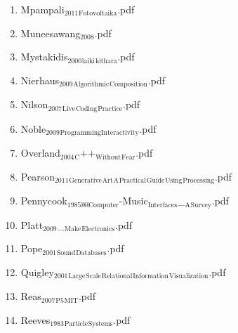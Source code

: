\documentclass[11pt]{article}
\begin{document}
\begin{enumerate}
\begin{enumerate}
\begin{enumerate}
\begin{enumerate}
\begin{enumerate}
\item Mpampali$_{\text{2011}}$$_{\text{Fotovoltaika}}$.pdf
\label{sec-1-1-1-1-7-1-1-75}

\item Muneesawang$_{\text{2008}}$.pdf
\label{sec-1-1-1-1-7-1-1-76}

\item Mystakidis$_{\text{2000}}$$_{\text{laiki}}$$_{\text{kithara}}$.pdf
\label{sec-1-1-1-1-7-1-1-77}

\item Nierhaus$_{\text{2009}}$$_{\text{Algorithmic}}$$_{\text{Composition}}$.pdf
\label{sec-1-1-1-1-7-1-1-78}

\item Nilson$_{\text{2007}}$$_{\text{Live}}$$_{\text{Coding}}$$_{\text{Practice}}$.pdf
\label{sec-1-1-1-1-7-1-1-79}

\item Noble$_{\text{2009}}$$_{\text{ProgrammingInteractivity}}$.pdf
\label{sec-1-1-1-1-7-1-1-80}

\item Overland$_{\text{2004}}$$_{\text{C}}$++$_{\text{Without}}$$_{\text{Fear}}$.pdf
\label{sec-1-1-1-1-7-1-1-81}

\item Pearson$_{\text{2011}}$$_{\text{Generative}}$$_{\text{Art}}$$_{\text{A}}$$_{\text{Practical}}$$_{\text{Guide}}$$_{\text{Using}}$$_{\text{Processing}}$.pdf
\label{sec-1-1-1-1-7-1-1-82}

\item Pennycook$_{\text{1985}}$$_{\text{￼Computer}}$-Music$_{\text{Interfaces}}$\_$_{\text{A}}$$_{\text{Survey}}$.pdf
\label{sec-1-1-1-1-7-1-1-83}

\item Platt$_{\text{2009}}$\_$_{\text{Make}}$$_{\text{Electronics}}$.pdf
\label{sec-1-1-1-1-7-1-1-84}

\item Pope$_{\text{2001}}$$_{\text{Sound}}$$_{\text{Databases}}$.pdf
\label{sec-1-1-1-1-7-1-1-85}

\item Quigley$_{\text{2001}}$$_{\text{Large}}$$_{\text{Scale}}$$_{\text{Relational}}$$_{\text{Information}}$$_{\text{Visualization}}$.pdf
\label{sec-1-1-1-1-7-1-1-86}

\item Reas$_{\text{2007}}$$_{\text{P5}}$$_{\text{MIT}}$.pdf
\label{sec-1-1-1-1-7-1-1-87}

\item Reeves$_{\text{1983}}$$_{\text{Particle}}$$_{\text{Systems}}$.pdf
\label{sec-1-1-1-1-7-1-1-88}


\end{enumerate}
\end{enumerate}
\end{enumerate}
\end{enumerate}
\end{enumerate}
\end{document}
